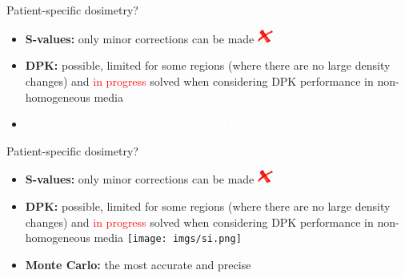 \documentclass[ignorenonframetext,]{beamer}
\begin{document}
\begin{frame}{Patient-specific dosimetry?}
\protect\hypertarget{patient-specific-dosimetry-1}{}

\begin{itemize}
\item
  \textbf{S-values:} only minor corrections can be made \hspace{.2cm}
  \includegraphics[width=5mm,height=\textheight]{imgs/no.png}
\item
  \textbf{DPK:} possible, limited for some regions (where there are no
  large density changes) and \textcolor{red}{in progress} solved when
  considering DPK performance in non-homogeneous media
\item
  \textcolor{white}{**Monte Carlo:** the most accurate and precise}
\end{itemize}

\end{frame}

\begin{frame}{Patient-specific dosimetry?}
\protect\hypertarget{patient-specific-dosimetry-2}{}

\begin{itemize}
\item
  \textbf{S-values:} only minor corrections can be made \hspace{.2cm}
  \includegraphics[width=5mm,height=\textheight]{imgs/no.png}
\item
  \textbf{DPK:} possible, limited for some regions (where there are no
  large density changes) and \textcolor{red}{in progress} solved when
  considering DPK performance in non-homogeneous media \hspace{.2cm}
  \texttt{[image: imgs/si.png]}
\item
  \textbf{Monte Carlo:} the most accurate and precise
\end{itemize}

\end{frame}
\end{document}

